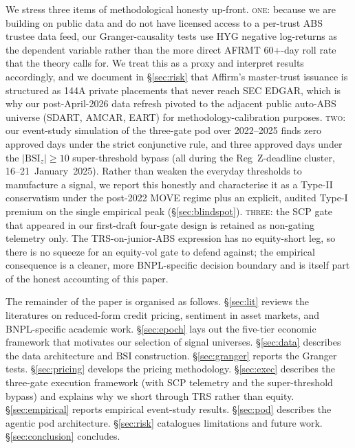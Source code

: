 \documentclass[11pt,letterpaper]{article}
\newcommand{\bsi}{\text{BSI}}
\begin{document}
We stress three items of methodological honesty up-front.
\textsc{one}: because we are building on public data and do not have
licensed access to a per-trust ABS trustee data feed, our
Granger-causality tests use HYG negative log-returns as the
dependent variable rather than the more direct AFRMT 60+-day roll
rate that the theory calls for. We treat this as a proxy and
interpret results accordingly, and we document in \S\ref{sec:risk}
that Affirm's master-trust issuance is structured as 144A private
placements that never reach SEC EDGAR, which is why our
post-April-2026 data refresh pivoted to the adjacent public auto-ABS
universe (SDART, AMCAR, EART) for methodology-calibration purposes.
\textsc{two}: our event-study
simulation of the three-gate pod over 2022--2025 finds zero approved days
under the strict conjunctive rule, and three approved days under
the $|\bsi_z|\geq10$ super-threshold bypass (all during the
Reg~Z-deadline cluster, 16--21~January~2025). Rather than weaken the
everyday thresholds to manufacture a signal, we report this honestly
and characterise it as a Type-II conservatism under the post-2022
MOVE regime plus an explicit, audited Type-I premium on the single
empirical peak (\S\ref{sec:blindspot}). \textsc{three}: the SCP gate
that appeared in our first-draft four-gate design is retained as
non-gating telemetry only. The TRS-on-junior-ABS expression has no
equity-short leg, so there is no squeeze for an equity-vol gate to
defend against; the empirical consequence is a cleaner, more
BNPL-specific decision boundary and is itself part of the honest
accounting of this paper.

The remainder of the paper is organised as follows.
\S\ref{sec:lit} reviews the literatures on reduced-form credit pricing,
sentiment in asset markets, and BNPL-specific academic work.
\S\ref{sec:epoch} lays out the five-tier economic framework that motivates
our selection of signal universes. \S\ref{sec:data} describes the data
architecture and $\bsi$ construction. \S\ref{sec:granger} reports the
Granger tests. \S\ref{sec:pricing} develops the pricing methodology.
\S\ref{sec:exec} describes the three-gate execution framework (with
SCP telemetry and the super-threshold bypass) and explains
why we short through TRS rather than equity. \S\ref{sec:empirical} reports
empirical event-study results. \S\ref{sec:pod} describes the agentic pod
architecture. \S\ref{sec:risk} catalogues limitations and future work.
\S\ref{sec:conclusion} concludes.


\end{document}
